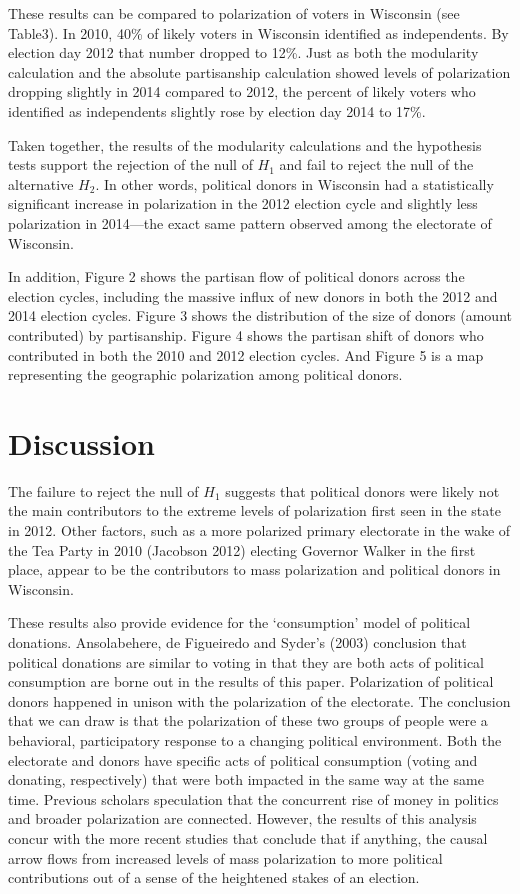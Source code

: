 \documentclass[12pt,]{article}
\begin{document}
These results can be compared to polarization of voters in Wisconsin
(see Table3). In 2010, 40\% of likely voters in Wisconsin identified as
independents. By election day 2012 that number dropped to 12\%. Just as
both the modularity calculation and the absolute partisanship
calculation showed levels of polarization dropping slightly in 2014
compared to 2012, the percent of likely voters who identified as
independents slightly rose by election day 2014 to 17\%.

Taken together, the results of the modularity calculations and the
hypothesis tests support the rejection of the null of \(H_{1}\) and fail
to reject the null of the alternative \(H_{2}\). In other words,
political donors in Wisconsin had a statistically significant increase
in polarization in the 2012 election cycle and slightly less
polarization in 2014---the exact same pattern observed among the
electorate of Wisconsin.

In addition, Figure 2 shows the partisan flow of political donors across
the election cycles, including the massive influx of new donors in both
the 2012 and 2014 election cycles. Figure 3 shows the distribution of
the size of donors (amount contributed) by partisanship. Figure 4 shows
the partisan shift of donors who contributed in both the 2010 and 2012
election cycles. And Figure 5 is a map representing the geographic
polarization among political donors.

\hypertarget{discussion}{%
\section{Discussion}\label{discussion}}

The failure to reject the null of \(H_{1}\) suggests that political
donors were likely not the main contributors to the extreme levels of
polarization first seen in the state in 2012. Other factors, such as a
more polarized primary electorate in the wake of the Tea Party in 2010
(Jacobson 2012) electing Governor Walker in the first place, appear to
be the contributors to mass polarization and political donors in
Wisconsin.

These results also provide evidence for the `consumption' model of
political donations. Ansolabehere, de Figueiredo and Syder's (2003)
conclusion that political donations are similar to voting in that they
are both acts of political consumption are borne out in the results of
this paper. Polarization of political donors happened in unison with the
polarization of the electorate. The conclusion that we can draw is that
the polarization of these two groups of people were a behavioral,
participatory response to a changing political environment. Both the
electorate and donors have specific acts of political consumption
(voting and donating, respectively) that were both impacted in the same
way at the same time. Previous scholars speculation that the concurrent
rise of money in politics and broader polarization are connected.
However, the results of this analysis concur with the more recent
studies that conclude that if anything, the causal arrow flows from
increased levels of mass polarization to more political contributions
out of a sense of the heightened stakes of an election.
\end{document}

